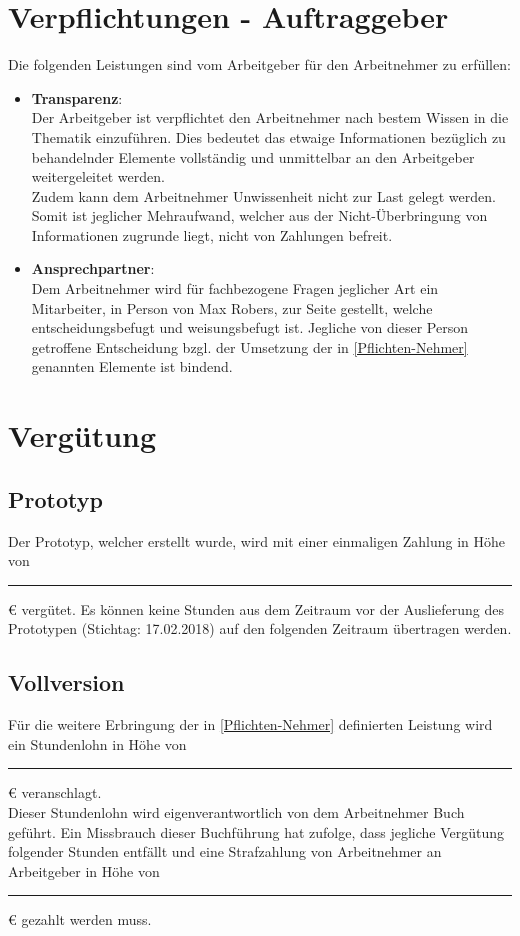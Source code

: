 \documentclass[a4paper,12pt]{article}
\newcommand{\stellvertreter}{Max Robers}
\newcommand{\prototypTag}{17.02.2018}
\begin{document}
	\section{Verpflichtungen - Auftraggeber} \label{Pflichten-Geber}
		Die folgenden Leistungen sind vom Arbeitgeber für den Arbeitnehmer zu erfüllen:
		\begin{itemize}
			\item \textbf{Transparenz}: \label{Transparenz}\\
				Der Arbeitgeber ist verpflichtet den Arbeitnehmer nach bestem Wissen in die Thematik einzuführen. Dies bedeutet das etwaige Informationen bezüglich zu behandelnder Elemente vollständig und unmittelbar an den Arbeitgeber weitergeleitet werden. \\
				Zudem kann dem Arbeitnehmer Unwissenheit nicht zur Last gelegt werden. Somit ist jeglicher Mehraufwand, welcher aus der Nicht-Überbringung von Informationen zugrunde liegt, nicht von Zahlungen befreit.
			\item \textbf{Ansprechpartner}: \label{Ansprechpartner}\\
				Dem Arbeitnehmer wird für fachbezogene Fragen jeglicher Art ein Mitarbeiter, in Person von \stellvertreter, zur Seite gestellt, welche entscheidungsbefugt und weisungsbefugt ist. Jegliche von dieser Person getroffene Entscheidung bzgl. der Umsetzung der in \ref{Pflichten-Nehmer} genannten Elemente ist bindend.
		\end{itemize}
	\section{Vergütung} \label{Verguetung}
		\subsection{Prototyp} %
			Der Prototyp, welcher erstellt wurde, wird mit einer einmaligen Zahlung in Höhe von \rule{1cm}{0.4pt} \euro\xspace vergütet. Es können keine Stunden aus dem Zeitraum vor der Auslieferung des Prototypen (Stichtag: \prototypTag) auf den folgenden Zeitraum übertragen werden.
		\subsection{Vollversion} %
			Für die weitere Erbringung der in \ref{Pflichten-Nehmer} definierten Leistung wird ein Stundenlohn in Höhe von \rule{1cm}{0.4pt} \euro\xspace veranschlagt.\\
			Dieser Stundenlohn wird eigenverantwortlich von dem Arbeitnehmer Buch geführt. Ein Missbrauch dieser Buchführung hat zufolge, dass jegliche Vergütung folgender Stunden entfällt und eine Strafzahlung von Arbeitnehmer an Arbeitgeber in Höhe von \rule{1cm}{0.4pt} \euro\xspace gezahlt werden muss.
\end{document}
